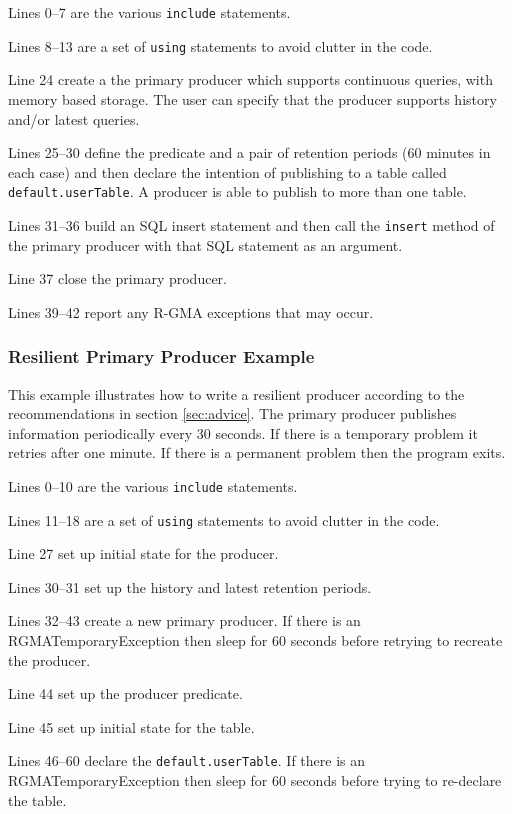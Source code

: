 Lines 0--7 are the various \texttt{include} statements.

Lines 8--13 are a set of \texttt{using} statements to avoid clutter
in the code.

Line 24 create a the primary producer which supports continuous
queries, with memory based storage. The user can specify that the
producer supports history and/or latest queries.

Lines 25--30 define the predicate and a pair of retention periods (60
minutes in each case) and then declare the intention of publishing to
a table called \texttt{default.userTable}. A producer is able to
publish to more than one table.

Lines 31--36 build an SQL insert statement and then call
the \texttt{insert} method of the primary producer with that SQL
statement as an argument.

Line 37 close the primary producer.

Lines 39--42 report any R-GMA exceptions that may occur.

\subsubsection{Resilient Primary Producer Example}

This example illustrates how to write a resilient producer according
to the recommendations in section \ref{sec:advice}.  The primary
producer publishes information periodically every 30 seconds. If there
is a temporary problem it retries after one minute. If there is a
permanent problem then the program exits.



Lines 0--10 are the various \texttt{include} statements.

Lines 11--18 are a set of \texttt{using} statements to avoid clutter
in the code.

Line 27 set up initial state for the producer.

Lines 30--31 set up the history and latest retention periods.

Lines 32--43 create a new primary producer. If there is an
RGMATemporaryException then sleep for 60 seconds before retrying to
recreate the producer.

Line 44 set up the producer predicate.

Line 45 set up initial state for the table.

Lines 46--60 declare the \texttt{default.userTable}. If there is an
RGMATemporaryException then sleep for 60 seconds before trying to
re-declare the table.

